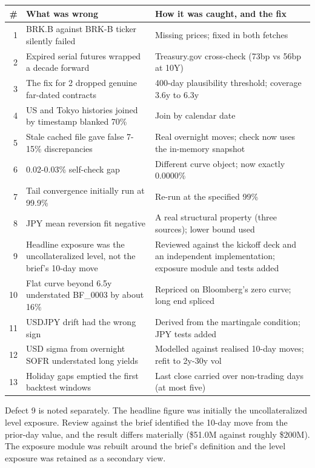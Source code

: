 \documentclass[11pt,letterpaper]{article}
\begin{document}
\begin{center}
\footnotesize
\begin{tabular}{@{}r p{6.6cm} p{7.4cm}@{}}
\toprule
\textbf{\#} & \textbf{What was wrong} & \textbf{How it was caught, and the fix}\\
\midrule
1 & BRK.B against BRK-B ticker silently failed & Missing prices; fixed in both fetches\\
2 & Expired serial futures wrapped a decade forward & Treasury.gov cross-check (73bp vs 56bp at 10Y)\\
3 & The fix for 2 dropped genuine far-dated contracts & 400-day plausibility threshold; coverage 3.6y to 6.3y\\
4 & US and Tokyo histories joined by timestamp blanked 70\% & Join by calendar date\\
5 & Stale cached file gave false 7-15\% discrepancies & Real overnight moves; check now uses the in-memory snapshot\\
6 & 0.02-0.03\% self-check gap & Different curve object; now exactly 0.0000\%\\
7 & Tail convergence initially run at 99.9\% & Re-run at the specified 99\%\\
8 & JPY mean reversion fit negative & A real structural property (three sources); lower bound used\\
9 & Headline exposure was the uncollateralized level, not the brief's 10-day move & Reviewed against the kickoff deck and an independent implementation; exposure module and tests added\\
10 & Flat curve beyond 6.5y understated BF\_0003 by about 16\% & Repriced on Bloomberg's zero curve; long end spliced\\
11 & USDJPY drift had the wrong sign & Derived from the martingale condition; JPY tests added\\
12 & USD sigma from overnight SOFR understated long yields & Modelled against realised 10-day moves; refit to 2y-30y vol\\
13 & Holiday gaps emptied the first backtest windows & Last close carried over non-trading days (at most five)\\
\bottomrule
\end{tabular}
\end{center}

Defect 9 is noted separately. The headline figure was initially the uncollateralized level exposure. Review against the brief identified the 10-day move from the prior-day value, and the result differs materially (\$51.0M against roughly \$200M). The exposure module was rebuilt around the brief's definition and the level exposure was retained as a secondary view.
\end{document}
